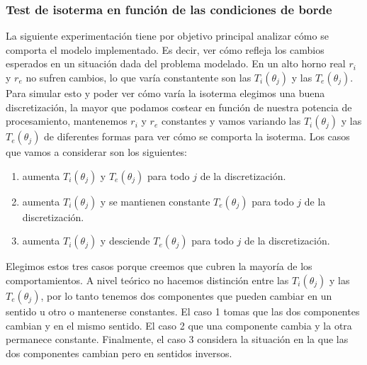 \subsubsection{Test de isoterma en función de las condiciones de borde}
La siguiente experimentación tiene por objetivo principal analizar cómo se comporta el modelo implementado. Es decir, ver cómo refleja los cambios esperados en un situación dada del problema modelado.
En un alto horno real $r_i$ y $r_e$ no sufren cambios, lo que varía constantente son las $T_i(\theta_j)$ y las $T_e(\theta_j)$. Para simular esto y poder ver cómo varía la isoterma elegimos una buena discretización, la mayor que podamos costear en función de nuestra potencia de procesamiento, mantenemos $r_i$ y $r_e$ constantes y vamos variando las $T_i(\theta_j)$ y las $T_e(\theta_j)$ de diferentes formas para ver cómo se comporta la isoterma.
Los casos que vamos a considerar son los siguientes:
\begin{enumerate}
 \item aumenta $T_i(\theta_j)$ y $T_e(\theta_j)$ para todo $j$ de la discretización.
 \item aumenta $T_i(\theta_j)$ y se mantienen constante $T_e(\theta_j)$ para todo $j$ de la discretización.
 \item aumenta $T_i(\theta_j)$ y desciende $T_e(\theta_j)$ para todo $j$ de la discretización.
\end{enumerate}
Elegimos estos tres casos porque creemos que cubren la mayoría de los comportamientos. A nivel teórico no hacemos distinción entre las $T_i(\theta_j)$ y las $T_e(\theta_j)$, por lo tanto tenemos dos componentes que pueden cambiar en un sentido u otro o mantenerse constantes. El caso 1 tomas que las dos componentes cambian y en el mismo sentido. El caso 2 que una componente cambia y la otra permanece constante. Finalmente, el caso 3 considera la situación en la que las dos componentes cambian pero en sentidos inversos.
